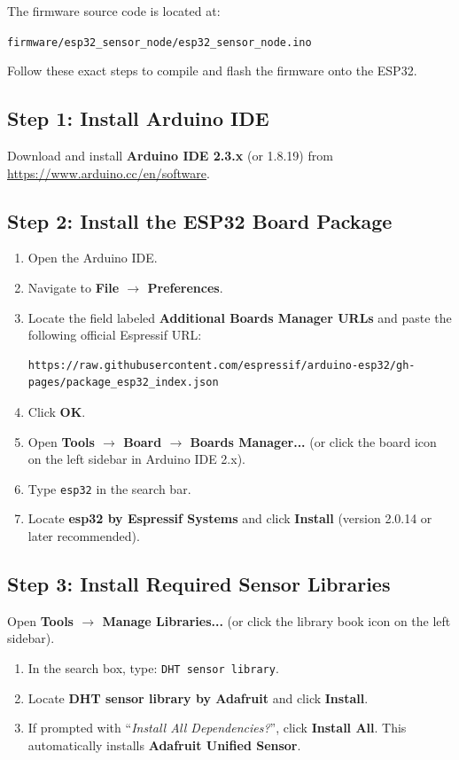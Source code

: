 \documentclass[11pt,a4paper]{article}
\begin{document}
The firmware source code is located at:
\begin{center}
\texttt{firmware/esp32\_sensor\_node/esp32\_sensor\_node.ino}
\end{center}

Follow these exact steps to compile and flash the firmware onto the ESP32.

\subsection{Step 1: Install Arduino IDE}
Download and install \textbf{Arduino IDE 2.3.x} (or 1.8.19) from \url{https://www.arduino.cc/en/software}.

\subsection{Step 2: Install the ESP32 Board Package}
\begin{enumerate}
    \item Open the Arduino IDE.
    \item Navigate to \textbf{File $\rightarrow$ Preferences}.
    \item Locate the field labeled \textbf{Additional Boards Manager URLs} and paste the following official Espressif URL:
\begin{lstlisting}[numbers=none]
https://raw.githubusercontent.com/espressif/arduino-esp32/gh-pages/package_esp32_index.json
\end{lstlisting}
    \item Click \textbf{OK}.
    \item Open \textbf{Tools $\rightarrow$ Board $\rightarrow$ Boards Manager...} (or click the board icon on the left sidebar in Arduino IDE 2.x).
    \item Type \texttt{esp32} in the search bar.
    \item Locate \textbf{esp32 by Espressif Systems} and click \textbf{Install} (version 2.0.14 or later recommended).
\end{enumerate}

\subsection{Step 3: Install Required Sensor Libraries}
Open \textbf{Tools $\rightarrow$ Manage Libraries...} (or click the library book icon on the left sidebar).
\begin{enumerate}
    \item In the search box, type: \texttt{DHT sensor library}.
    \item Locate \textbf{DHT sensor library by Adafruit} and click \textbf{Install}.
    \item If prompted with ``\textit{Install All Dependencies?}'', click \textbf{Install All}. This automatically installs \textbf{Adafruit Unified Sensor}.
\end{enumerate}
\end{document}
